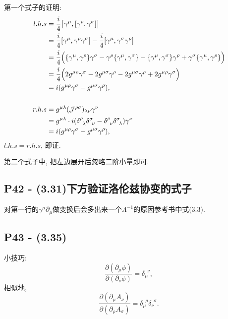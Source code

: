 \documentclass[10pt,b5paper,openany]{book}
\begin{document}
第一个式子的证明: 
\begin{equation}
  \begin{aligned}
    l.h.s &= \frac{i}{4}\bigl[\gamma^\mu, [\gamma^\rho, \gamma^\sigma]\bigr] \\
    &= \frac{i}{4}[\gamma^\mu, \gamma^\rho \gamma^\sigma] - \frac{i}{4}[\gamma^\mu, \gamma^\sigma \gamma^\rho] \\ 
    &= \frac{i}{4}\Bigl(\{\gamma^\mu, \gamma^\rho\}\gamma^\sigma - \gamma^\rho\{\gamma^\mu, \gamma^\sigma\} - \{\gamma^\mu, \gamma^\sigma\}\gamma^\rho + \gamma^\sigma\{\gamma^\mu, \gamma^\rho\}\Bigr) \\
    &= \frac{i}{4}\Bigl(2g^{\mu\rho}\gamma^\sigma - 2g^{\mu\sigma}\gamma^\rho - 2g^{\mu\sigma}\gamma^\rho + 2g^{\mu\rho}\gamma^\sigma \Bigr) \\
    &= i(g^{\mu\rho}\gamma^\sigma - g^{\mu\sigma}\gamma^\rho), \\
    \ \\
    r.h.s &= g^{\mu\lambda}(\mathcal{J}^{\rho\sigma})_{\lambda\nu} \gamma^\nu \\
    &= g^{\mu\lambda}\cdot i(\delta^\rho_{\phantom{1}\lambda} \delta^\sigma_{\phantom{1}\nu} - \delta^\rho_{\phantom{1}\nu} \delta^\sigma_{\phantom{1}\lambda}) \gamma^\nu \\ 
    &= i(g^{\mu\rho}\gamma^\sigma - g^{\mu\sigma}\gamma^\rho), 
  \end{aligned}
\end{equation}
$l.h.s = r.h.s$, 即证. 

第二个式子中, 把左边展开后忽略二阶小量即可. 

\subsection{P42 - (3.31)下方验证洛伦兹协变的式子}

对第一行的$\gamma^\mu \partial_\mu$做变换后会多出来一个$\Lambda^{-1}$的原因参考书中式(3.3).

\subsection{P43 - (3.35)}

小技巧: 
\begin{equation}
  \frac{\partial (\partial_\mu \phi)}{\partial (\partial_\nu \phi)} = \delta_\mu^{\phantom{1}\nu}, 
\end{equation}
相似地, 
\begin{equation}
  \frac{\partial (\partial_\mu A_\nu)}{\partial (\partial_\rho A_\sigma)} = \delta_\mu^{\phantom{1}\rho}\delta_\nu^{\phantom{1}\sigma}.
\end{equation}
\end{document}
